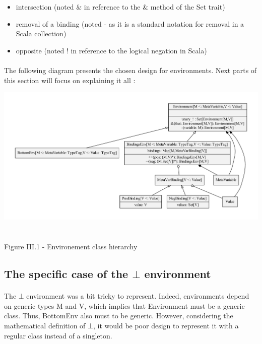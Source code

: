 \documentclass{report}
\begin{document}
\vspace{1.5mm}
\begin{itemize}
\item intersection (noted \& in reference to the \& method of the Set trait)\vspace{1mm}
\item removal of a binding (noted - as it is a standard notation for removal in a Scala collection)\vspace{1mm}
\item opposite (noted ! in reference to the logical negation in Scala)\vspace{1mm}
\end{itemize}

\paragraph{}
\hspace{4mm}The following diagram presents the chosen design for environments. Next parts of this section will focus on explaining it all :

\begin{center}
\includegraphics[scale=0.5]{data/Env}
~\\~\\Figure III.1 - Environement class hierarchy
\end{center}

\subsection* {The specific case of the $\bot$ environment}
\paragraph{}
\hspace{4mm}The $\bot$ environment was a bit tricky to represent. Indeed, environments depend on generic types
M and V, which implies that Environment must be a generic class. Thus, BottomEnv also must to be generic. However, 
considering the mathematical definition of $\bot$, it would be poor design to represent it with a regular class instead of a singleton.
\end{document}
